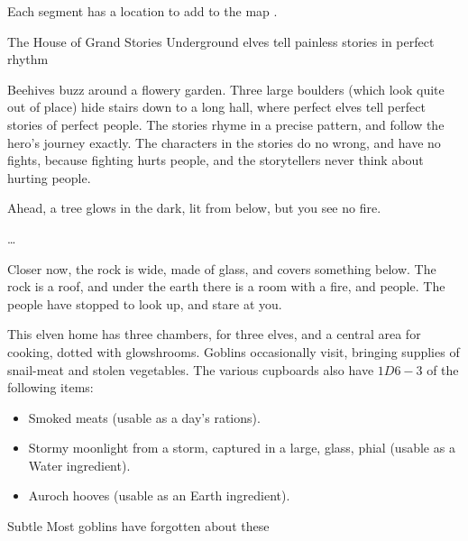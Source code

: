 
Each \gls{segment} has a location to add to the map .

{The House of Grand Stories}%
{Underground elves tell painless stories in perfect rhythm}%

Beehives buzz around a flowery garden.
Three large boulders (which look quite out of place) hide stairs down to a long hall, where perfect elves tell perfect stories of perfect people.
The stories rhyme in a precise pattern, and follow the hero's journey exactly.
The characters in the stories do no wrong, and have no fights, because fighting hurts people, and the storytellers never think about hurting people.

\begin{boxtext}
  Ahead, a tree glows in the dark, lit from below, but you see no fire.

  \ldots

  Closer now, the rock is  wide, made of glass, and covers something below.
  The rock is a roof, and under the earth there is a room with a fire, and people.
  The people have stopped to look up, and stare at you.
\end{boxtext}

\label{ravencopsFireIngredients}
This elven home has three chambers, for three elves, and a central area for cooking, dotted with \glspl{glowshroom}.
Goblins occasionally visit, bringing supplies of snail-meat and stolen vegetables.
The various cupboards also have $1D6-3$ of the following items:

\begin{itemize}
  \item
  Smoked meats (usable as a day's \glspl{ration}).
  \item
  Stormy moonlight from a storm, captured in a large, glass, phial (usable as a Water \gls{ingredient}).
  \item
  Auroch hooves (usable as an Earth \gls{ingredient}).
\end{itemize}



%

{Subtle }%
{Most goblins have forgotten about these }%


